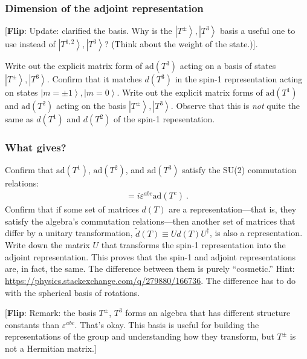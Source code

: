 \documentclass[12pt]{article}
\numberwithin{equation}{subsection}    %
\renewcommand{\tilde}{\widetilde}   %
\newcommand{\ket}[1]{\left|#1\right\rangle}    %
\newcommand{\flip}[1]{{\color{red} [\textbf{Flip}: {#1}]}}
\begin{document}
\subsubsection{Dimension of the adjoint representation}

\flip{Update: clarified the basis. Why is the $\ket{T^\pm}, \ket{T^3}$ basis a useful one to use instead of $\ket{T^{1,2}}, \ket{T^3}$? (Think about the weight of the state.)}.

Write out the explicit matrix form of $\text{ad}(T^3)$ acting on a basis of states $\ket{T^\pm}, \ket{T^3}$. Confirm that it matches $d(T^3)$ in the spin-1 representation acting on states $\ket{m=\pm1}, \ket{m=0}$. Write out the explicit matrix forms of $\text{ad}(T^1)$ and $\text{ad}(T^2)$ acting on the basis $\ket{T^\pm}, \ket{T^3}$. Observe that this is \emph{not} quite the same as $d(T^1)$ and $d(T^2)$ of the spin-1 repesentation.

\subsubsection{What gives?}

Confirm that $\text{ad}(T^1)$, $\text{ad}(T^2)$, and $\text{ad}(T^3)$ satisfy the SU(2) commutation relations:
\begin{align}
  [\text{ad}(T^a), \text{ad}(T^b)] = i\varepsilon^{abc}\text{ad}(T^c) \ .
\end{align}
Confirm that if some set of matrices $d(T)$ are a representation---that is, they satisfy the algebra's commutation relations---then another set of matrices that differ by a unitary transformation, $\tilde d(T) \equiv U d(T) U^\dag$, is also a representation. Write down the matrix $U$ that transforms the spin-1 representation into the adjoint representation. This proves that the spin-1 and adjoint representations are, in fact, the same. The difference between them is purely ``cosmetic.'' Hint: \url{https://physics.stackexchange.com/q/279880/166736}. The difference has to do with the spherical basis of rotations.

\flip{Remark: the basis $T^\pm$, $T^3$ forms an algebra that has different structure constants than $\varepsilon^{abc}$. That's okay. This basis is useful for building the representations of the group and understanding how they transform, but $T^\pm$ is not a Hermitian matrix.}
\end{document}

